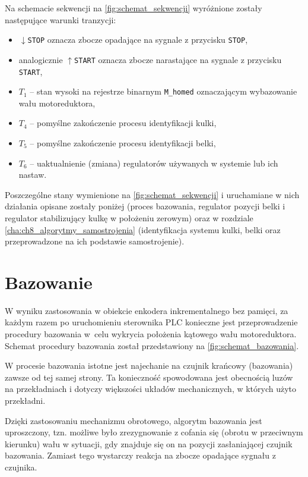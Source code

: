 Na schemacie sekwencji na \cref{fig:schemat_sekwencji} wyróżnione zostały następujące warunki tranzycji:
\begin{itemize}
    \item $\downarrow$\texttt{STOP} oznacza zbocze opadające na sygnale z przycisku \texttt{STOP},
    \item analogicznie $\uparrow$\texttt{START} oznacza zbocze narastające na sygnale z przycisku \texttt{START},
    \item $T_1$ -- stan wysoki na rejestrze binarnym \texttt{M\_homed} oznaczającym wybazowanie wału motoreduktora,
    \item $T_4$ -- pomyślne zakończenie procesu identyfikacji kulki,
    \item $T_5$ -- pomyślne zakończenie procesu identyfikacji belki,
    \item $T_6$ -- uaktualnienie (zmiana) regulatorów używanych w systemie lub ich nastaw.
\end{itemize}

Poszczególne stany wymienione na \cref{fig:schemat_sekwencji} i uruchamiane w nich działania opisane zostały poniżej (proces bazowania, regulator pozycji belki i regulator stabilizujący kulkę w położeniu zerowym) oraz w rozdziale \ref{cha:ch8_algorytmy_samostrojenia} (identyfikacja systemu kulki, belki oraz przeprowadzone na ich podstawie samostrojenie).

\section{Bazowanie}
\label{sec:ch7_bazowanie}

W wyniku zastosowania w obiekcie enkodera inkrementalnego bez pamięci, za każdym razem po uruchomieniu sterownika PLC konieczne jest przeprowadzenie procedury bazowania w~celu wykrycia położenia kątowego wału motoreduktora. Schemat procedury bazowania został przedstawiony na \cref{fig:schemat_bazowania}.

W procesie bazowania istotne jest najechanie na czujnik krańcowy (bazowania) zawsze od tej samej strony. Ta konieczność spowodowana jest obecnością luzów na przekładniach i dotyczy większości układów mechanicznych, w których użyto przekładni.

Dzięki zastosowaniu mechanizmu obrotowego, algorytm bazowania jest uproszczony, tzn. możliwe było zrezygnowanie z cofania się (obrotu w przeciwnym kierunku) wału w sytuacji, gdy znajduje się on na pozycji zasłaniającej czujnik bazowania. Zamiast tego wystarczy reakcja na zbocze opadające sygnału z czujnika.

